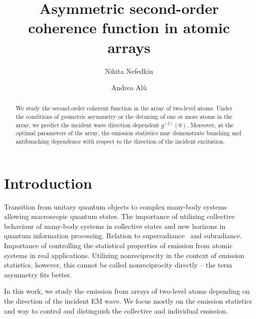 \documentclass[aps,prl,twocolumn,superscriptaddress,showpacs,amsmath,amssymb]{revtex4-2}
\begin{document}
\title{Asymmetric second-order coherence function in atomic arrays}

\author{Nikita Nefedkin}

\author{Andrea Alù}


\begin{abstract}
    We study the second-order coherent function in the array of two-level atoms. 
    Under the conditions of geometric asymmetry or the detuning of one or more atoms in the array, we predict the incident wave direction dependent $g^{(2)}(0)$. 
    Moreover, at the optimal parameters of the array, the emission statistics may demonstrate bunching and antibunching dependence with respect to the direction of the incident excitation.
\end{abstract}

\maketitle

\section{Introduction}\label{sec:intro}

Transition from unitary quantum objects to complex many-body systems allowing macroscopic quantum states. 
The importance of utilizing collective behaviour of many-body systems in collective states and new horizons in quantum information processing.
Relation to superradiance~\cite{nefedkin2016superradiance} and subradiance.
Importance of controlling the statistical properties of emission from atomic systems in real applications.
Utilizing nonreciprocity in the context of emission statistics, however, this cannot be called nonreciprocity directly -- the term asymmetry fits better.

In this work, we study the emission from arrays of two-level atoms depending on the direction of the incident EM wave.
We focus mostly on the emission statistics and way to control and distinguish the collective and individual emission.
\end{document}
